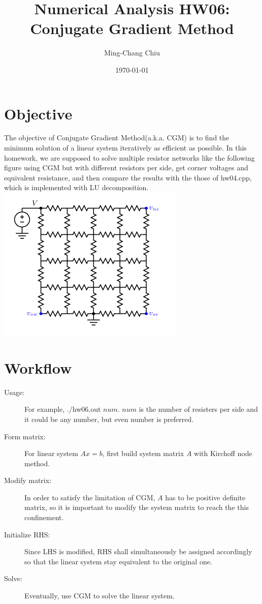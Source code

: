\documentclass[12pt,a4paper]{article}
\title{Numerical Analysis HW06: Conjugate Gradient Method}
\author{Ming-Chang Chiu}
\date{\today}
\begin{document}
\maketitle
\fontsize{12}{20pt}\selectfont %

\section{Objective}
The objective of Conjugate Gradient Method(a.k.a. CGM) is to find the minimum solution of a linear system iteratively as efficient as possible. In this homework, we are supposed 
to solve multiple resistor networks like the following figure using CGM but with different resistors per side, get corner voltages and equivalent resistance, and then compare the results with the those of hw04.cpp, which is implemented with LU decomposition.
\includegraphics[scale =0.6 ]{./sample1.png}
\section{Workflow}

\begin{description}  

\item [Usage:] For example, ./hw06.out $num$. $num$ is the number of resisters per side and it could be any number, but even number is preferred. %
\item [Form matrix:] For linear system $Ax=b$, first build system matrix $A$ with Kirchoff node method.
\item [Modify matrix:] In order to satisfy the limitation of CGM, $A$ has to be positive definite matrix, so it is important to modify the system matrix to reach the this confinement. 
\item [Initialize RHS:]Since LHS is modified, RHS shall simultaneously be assigned accordingly so that the linear system stay equivalent to the original one.
\item [Solve:] Eventually, use CGM to solve the linear system.

\end{description}
\end{document}
